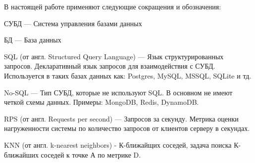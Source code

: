 \Abbreviations %
В настоящей работе применяют следующие сокращения и обозначения:

\noindent СУБД --- Система управления базами данных

\noindent БД --- База данных

\noindent SQL (от англ. Structured Query Language) --- Язык структурированных запросов. Декларативный язык запросов для взаимодействия с СУБД. Используется в таких базах данных как: Postgres, MySQL, MSSQL, SQLite и тд.

\noindent No-SQL --- Тип СУБД, которые не используют SQL. В основном не имеют четкой схемы данных. Примеры: MongoDB, Redis, DynamoDB.

\noindent RPS (от англ. Requests per second) --- Запросов за секунду. Метрика оценки нагруженности системы по количество запросов от клиентов серверу в секундах.

\noindent KNN (от англ. k-nearest neighbors) - К-ближайщих соседей, задача поиска К-ближайших соседей к точке А по метрике D. 

